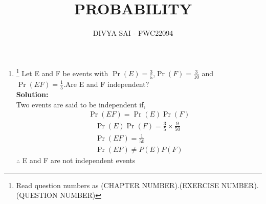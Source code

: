 \documentclass{article}
\providecommand{\pr}[1]{\ensuremath{\Pr\left(#1\right)}}
\newcommand{\solution}{\noindent \textbf{Solution: }}
\begin{document}
\title{PROBABILITY}
\author{\Large DIVYA SAI - FWC22094}
\date{}

\maketitle
\begin{enumerate}[label=13.\arabic{enumi}.\arabic{enumii}]%
\setcounter{enumi}{1}
\setcounter{enumii}{6}

\item \footnote{Read question numbers as (CHAPTER NUMBER).(EXERCISE NUMBER).(QUESTION NUMBER)} { Let E and F be events with $\pr{E}=\frac{3}{5}$,$\pr{F}=\frac{3}{10}$ and $\pr{E F}=\frac{1}{5}$.Are E and F independent?}\\[1ex]
\solution
\\
Two events are said to be independent if,
\begin{align}
&\pr{E F}=\pr{E} \pr{F}&
\end{align}
\begin{align}
&\pr{E} \pr{F}=\frac{3}{5} \times \frac{9}{50}&
\\
&\pr{E F}=\frac{1}{50}&
\\
&\pr{E F} \neq P(E) P(F)&
\end{align}
$\therefore$ E and F are not independent events
\end{enumerate}
\end{document}
